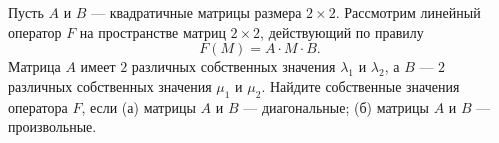 \documentclass{article}
\begin{document}
Пусть $A$ и $B$ --- квадратичные матрицы размера $2\times 2$. Рассмотрим линейный оператор $F$ на пространстве матриц $2\times 2$, 
действующий по правилу $$F(M) = A \cdot M \cdot B.$$
Матрица $A$ имеет $2$ различных собственных значения $\lambda_1$ и $\lambda_2$, а $B$ --- $2$ различных собственных значения $\mu_1$ и $\mu_2$. Найдите собственные значения оператора $F$,
если (а) матрицы $A$ и $B$ --- диагональные; (б) матрицы $A$ и $B$ --- произвольные.
\end{document}
